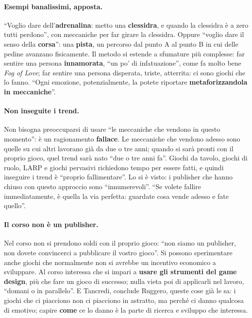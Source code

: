 \paragraph{Esempi banalissimi, apposta.} ``Voglio dare dell'\textbf{adrenalina}:
metto una \textbf{clessidra}, e quando la clessidra è a zero tutti perdono'', con
meccaniche per far girare la clessidra. Oppure ``voglio dare il senso della
\textbf{corsa}'': una \textbf{pista}, un percorso dal punto A al punto B in cui delle
pedine avanzano fisicamente. Il metodo si estende a sfumature più complesse: far
sentire una persona \textbf{innamorata}, ``un po' di infatuazione'', come fa molto
bene \emph{Fog of Love}; far sentire una persona disperata, triste, atterrita: ci sono
giochi che lo fanno. ``Ogni emozione, potenzialmente, la potete riportare
\textbf{metaforizzandola in meccaniche}''.

\paragraph{Non inseguite i trend.} Non bisogna preoccuparsi di usare ``le meccaniche
che vendono in questo momento'': è un ragionamento \textbf{fallace}. Le meccaniche che
vendono adesso sono quelle su cui altri lavorano già da due o tre anni; quando si sarà
pronti con il proprio gioco, quel trend sarà nato ``due o tre anni fa''. Giochi da
tavolo, giochi di ruolo, LARP e giochi pervasivi richiedono tempo per essere fatti, e
quindi inseguire i trend è ``proprio fallimentare''. Lo si è visto: i publisher che
hanno chiuso con questo approccio sono ``innumerevoli''. ``Se volete fallire
immediatamente, è quella la via perfetta: guardate cosa vende adesso e fate quello''.

\paragraph{Il corso non è un publisher.} Nel corso non si prendono soldi con il
proprio gioco: ``non siamo un publisher, non dovete convincerci a pubblicare il vostro
gioco''. Si possono sperimentare anche giochi che normalmente non si avrebbe un
incentivo economico a sviluppare. Al corso interessa che si impari a \textbf{usare gli
strumenti del game design}, più che fare un gioco di successo; nulla vieta poi di
applicarli nel lavoro, ``domani o in parallelo''. E Tancredi, conclude Ruggero, queste
cose già le sa: i giochi che ci piacciono non ci piacciono in astratto, ma perché ci
danno qualcosa di emotivo; capire \textbf{come} ce lo danno è la parte di ricerca e
sviluppo che interessa.

